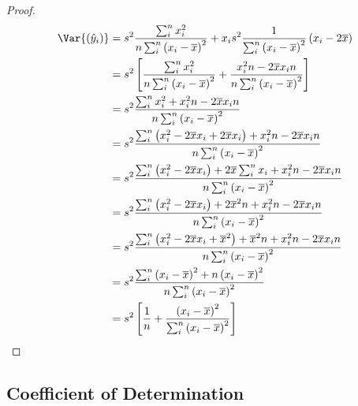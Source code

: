 \documentclass{article}
\begin{document}
\begin{proof}
    \allowdisplaybreaks{}
    \begin{align*}
        \Var{\left( \hat{y}_i \right)} & = s^2 \frac{\sum_i^n x_i^2}{n\sum_i^n \left( x_i - \overline{x} \right)^2} + x_i s^2 \frac{1}{\sum_i^n \left( x_i - \overline{x} \right)^2} \left( x_i - 2 \overline{x} \right)    \\
                                       & = s^2 \left[ \frac{\sum_i^n x_i^2}{n \sum_i^n \left( x_i - \overline{x} \right)^2} + \frac{x_i^2 n - 2 \overline{x} x_i n}{n \sum_i^n \left( x_i - \overline{x} \right)^2} \right] \\
                                       & = s^2 \frac{\sum_i^n x_i^2 + x_i^2 n - 2 \overline{x} x_i n}{n\sum_i^n \left( x_i - \overline{x} \right)^2}                                                                        \\
                                       & = s^2 \frac{\sum_i^n \left( x_i^2 - 2\overline{x}x_i + 2\overline{x} x_i \right) + x_i^2 n - 2 \overline{x} x_i n}{n\sum_i^n \left( x_i - \overline{x} \right)^2}                  \\
                                       & = s^2 \frac{\sum_i^n \left( x_i^2 - 2\overline{x}x_i \right) + 2\overline{x} \sum_i^n x_i + x_i^2 n - 2 \overline{x} x_i n}{n\sum_i^n \left( x_i - \overline{x} \right)^2}         \\
                                       & = s^2 \frac{\sum_i^n \left( x_i^2 - 2\overline{x}x_i \right) + 2\overline{x}^2 n + x_i^2 n - 2 \overline{x} x_i n}{n\sum_i^n \left( x_i - \overline{x} \right)^2}                  \\
                                       & = s^2 \frac{\sum_i^n \left( x_i^2 - 2\overline{x}x_i + \overline{x}^2 \right) + \overline{x}^2 n + x_i^2 n - 2 \overline{x} x_i n}{n\sum_i^n \left( x_i - \overline{x} \right)^2}  \\
                                       & = s^2 \frac{\sum_i^n \left( x_i - \overline{x} \right)^2 + n \left( x_i - \overline{x} \right)^2}{n\sum_i^n \left( x_i - \overline{x} \right)^2}                                   \\
                                       & = s^2 \left[ \frac{1}{n} + \frac{\left( x_i - \overline{x} \right)^2}{\sum_i^n \left( x_i - \overline{x} \right)^2} \right]
    \end{align*}
    \endgroup
\end{proof}
\subsection{Coefficient of Determination}
\end{document}
